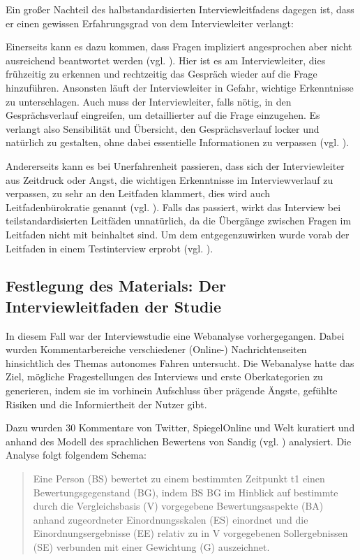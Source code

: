 \documentclass[12pt]{article}
\begin{document}
Ein großer Nachteil des halbstandardisierten Interviewleitfadens dagegen ist, dass er einen gewissen Erfahrungsgrad von dem Interviewleiter verlangt:

Einerseits kann es dazu kommen, dass Fragen impliziert angesprochen aber nicht ausreichend beantwortet werden (vgl. \cite[114]{flick1995qualitative}). Hier ist es am Interviewleiter, dies frühzeitig zu erkennen und rechtzeitig das Gespräch wieder auf die Frage hinzuführen. Ansonsten läuft der Interviewleiter in Gefahr, wichtige Erkenntnisse zu unterschlagen. Auch muss der Interviewleiter, falls nötig, in den Gesprächsverlauf eingreifen, um detaillierter auf die Frage einzugehen. Es verlangt also Sensibilität und Übersicht, den Gesprächsverlauf locker und natürlich zu gestalten, ohne dabei essentielle Informationen zu verpassen (vgl. \cite[130]{brosius2008methoden}).

Andererseits kann es bei Unerfahrenheit passieren, dass sich der Interviewleiter aus Zeitdruck oder Angst, die wichtigen Erkenntnisse im Interviewverlauf zu verpassen, zu sehr an den Leitfaden klammert, dies wird auch \glqq Leitfadenbürokratie\grqq{} genannt (vgl. \cite[101]{hopf1978pseudo}). Falls das passiert, wirkt das Interview bei teilstandardisierten Leitfäden unnatürlich, da die Übergänge zwischen Fragen im Leitfaden nicht mit beinhaltet sind. Um dem entgegenzuwirken wurde vorab der Leitfaden in einem Testinterview erprobt (vgl. \cite[130]{brosius2008methoden}).

\subsection*{Festlegung des Materials: Der Interviewleitfaden der Studie}
In diesem Fall war der Interviewstudie eine Webanalyse vorhergegangen. Dabei wurden Kommentarbereiche verschiedener (Online-) Nachrichtenseiten hinsichtlich des Themas autonomes Fahren untersucht. Die Webanalyse hatte das Ziel, mögliche Fragestellungen des Interviews und erste Oberkategorien zu generieren, indem sie im vorhinein Aufschluss über prägende Ängste, gefühlte Risiken und die Informiertheit der Nutzer gibt.

Dazu wurden 30 Kommentare von Twitter, SpiegelOnline und Welt kuratiert und anhand des Modell des sprachlichen Bewertens von Sandig (vgl. \cite[155]{sandig1987textwissen}) analysiert. Die Analyse folgt folgendem Schema:

\begin{quote}
  Eine Person (BS) bewertet zu einem bestimmten Zeitpunkt t1 einen Bewertungsgegenstand (BG), indem BS BG im Hinblick auf bestimmte durch die Vergleichsbasis (V) vorgegebene Bewertungsaspekte (BA) anhand zugeordneter Einordnungsskalen (ES) einordnet und die Einordnungsergebnisse (EE) relativ zu in V vorgegebenen Sollergebnissen (SE) verbunden mit einer Gewichtung (G) auszeichnet.
\end{quote}
\end{document}
